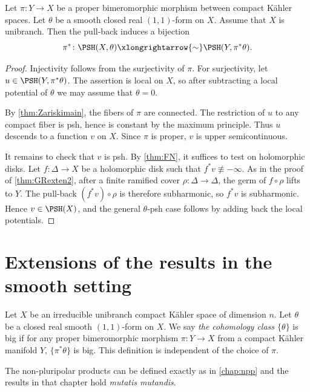 \begin{corollary}\label{cor:PSH}
    Let $\pi\colon Y\rightarrow X$ be a proper bimeromorphic morphism between compact K\"ahler spaces. Let $\theta$ be a smooth closed real $(1,1)$-form on $X$. Assume that $X$ is unibranch. Then the pull-back induces a bijection
    \[
    \pi^*\colon \PSH(X,\theta)\xlongrightarrow{\sim}\PSH(Y,\pi^*\theta).
    \]
\end{corollary}
\begin{proof}
    Injectivity follows from the surjectivity of $\pi$. For surjectivity, let $u\in \PSH(Y,\pi^*\theta)$. The assertion is local on $X$, so after subtracting a local potential of $\theta$ we may assume that $\theta=0$.

    By \cref{thm:Zariskimain}, the fibers of $\pi$ are connected. The restriction of $u$ to any compact fiber is psh, hence is constant by the maximum principle. Thus $u$ descends to a function $v$ on $X$. Since $\pi$ is proper, $v$ is upper semicontinuous.

    It remains to check that $v$ is psh. By \cref{thm:FN}, it suffices to test on holomorphic disks. Let $f\colon \Delta\rightarrow X$ be a holomorphic disk such that $f^*v\not\equiv -\infty$. As in the proof of \cref{thm:GRexten2}, after a finite ramified cover $\rho\colon \Delta\rightarrow \Delta$, the germ of $f\circ\rho$ lifts to $Y$. The pull-back $(f^*v)\circ\rho$ is therefore subharmonic, so $f^*v$ is subharmonic. Hence $v\in \PSH(X)$, and the general $\theta$-psh case follows by adding back the local potentials.
\end{proof}

\section{Extensions of the results in the smooth setting}
\label{sec:unib_ext}
Let $X$ be an irreducible unibranch compact K\"ahler space of dimension $n$. Let $\theta$ be a closed real smooth $(1,1)$-form on $X$. We say \emph{the cohomology class $\{\theta\}$} is big if for any proper bimeromorphic morphism $\pi\colon Y\rightarrow X$ from a compact K\"ahler manifold $Y$, $\{\pi^*\theta\}$ is big. This definition is independent of the choice of $\pi$.

The non-pluripolar products can be defined exactly as in \cref{chap:npp} and the results in that chapter hold \emph{mutatis mutandis}.

